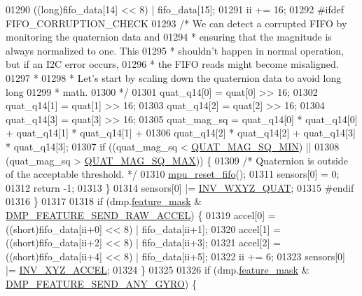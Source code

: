 \begin{DoxyCode}
01290             ((long)fifo\_data[14] << 8) | fifo\_data[15];
01291         ii += 16;
01292 \textcolor{preprocessor}{#ifdef FIFO\_CORRUPTION\_CHECK}
01293         \textcolor{comment}{/* We can detect a corrupted FIFO by monitoring the quaternion data and}
01294 \textcolor{comment}{         * ensuring that the magnitude is always normalized to one. This}
01295 \textcolor{comment}{         * shouldn't happen in normal operation, but if an I2C error occurs,}
01296 \textcolor{comment}{         * the FIFO reads might become misaligned.}
01297 \textcolor{comment}{         *}
01298 \textcolor{comment}{         * Let's start by scaling down the quaternion data to avoid long long}
01299 \textcolor{comment}{         * math.}
01300 \textcolor{comment}{         */}
01301         quat\_q14[0] = quat[0] >> 16;
01302         quat\_q14[1] = quat[1] >> 16;
01303         quat\_q14[2] = quat[2] >> 16;
01304         quat\_q14[3] = quat[3] >> 16;
01305         quat\_mag\_sq = quat\_q14[0] * quat\_q14[0] + quat\_q14[1] * quat\_q14[1] +
01306             quat\_q14[2] * quat\_q14[2] + quat\_q14[3] * quat\_q14[3];
01307         \textcolor{keywordflow}{if} ((quat\_mag\_sq < \hyperlink{group___d_r_i_v_e_r_s_gae76871da254b93d8b944ec65792db252}{QUAT\_MAG\_SQ\_MIN}) ||
01308             (quat\_mag\_sq > \hyperlink{group___d_r_i_v_e_r_s_ga3036f612f259f4e13c631a31fb0e7176}{QUAT\_MAG\_SQ\_MAX})) \{
01309             \textcolor{comment}{/* Quaternion is outside of the acceptable threshold. */}
01310             \hyperlink{group___d_r_i_v_e_r_s_gaf23e9f57c0059be6ec57862f0584de10}{mpu\_reset\_fifo}();
01311             sensors[0] = 0;
01312             \textcolor{keywordflow}{return} -1;
01313         \}
01314         sensors[0] |= \hyperlink{group___d_r_i_v_e_r_s_ga3d79cffe845a796a27d03432a1f2ade0}{INV\_WXYZ\_QUAT};
01315 \textcolor{preprocessor}{#endif}
01316     \}
01317 
01318     \textcolor{keywordflow}{if} (dmp.\hyperlink{structdmp__s_ac1c048fa56b613b3223d2e66ac2c050f}{feature\_mask} & \hyperlink{group___d_r_i_v_e_r_s_ga9eeb257febe4a305df7ad4cf31dc2755}{DMP\_FEATURE\_SEND\_RAW\_ACCEL}) \{
01319         accel[0] = ((short)fifo\_data[ii+0] << 8) | fifo\_data[ii+1];
01320         accel[1] = ((short)fifo\_data[ii+2] << 8) | fifo\_data[ii+3];
01321         accel[2] = ((short)fifo\_data[ii+4] << 8) | fifo\_data[ii+5];
01322         ii += 6;
01323         sensors[0] |= \hyperlink{group___d_r_i_v_e_r_s_gaa03f025a17ed491e70b88274e89c75c5}{INV\_XYZ\_ACCEL};
01324     \}
01325 
01326     \textcolor{keywordflow}{if} (dmp.\hyperlink{structdmp__s_ac1c048fa56b613b3223d2e66ac2c050f}{feature\_mask} & \hyperlink{group___d_r_i_v_e_r_s_gadda8f4118bd084cfb4fcda3571585c56}{DMP\_FEATURE\_SEND\_ANY\_GYRO}) \{

\end{DoxyCode}
